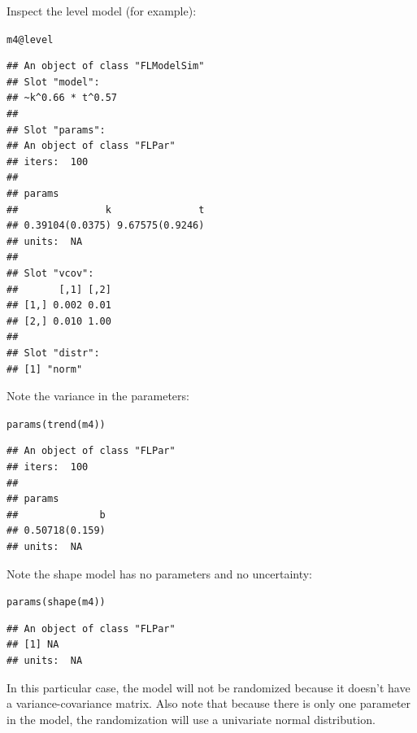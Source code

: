 \documentclass[a4paper,english,10pt]{article}\usepackage[]{graphicx}\usepackage[]{color}
\makeatletter
\newcommand{\hlopt}[1]{\textcolor[rgb]{0.196,0.196,0.196}{#1}}%
\newcommand{\hlstd}[1]{\textcolor[rgb]{0.196,0.196,0.196}{#1}}%
\newcommand{\hlkwc}[1]{\textcolor[rgb]{0,0.631,0.314}{#1}}%
\newcommand{\hlkwd}[1]{\textcolor[rgb]{0.78,0.227,0.412}{#1}}%
\newenvironment{kframe}{%
 \def\at@end@of@kframe{}%
 \ifinner\ifhmode%
  \def\at@end@of@kframe{\end{minipage}}%
  \begin{minipage}{\columnwidth}%
 \fi\fi%
 \def\FrameCommand##1{\hskip\@totalleftmargin \hskip-\fboxsep
 \colorbox{shadecolor}{##1}\hskip-\fboxsep
     \hskip-\linewidth \hskip-\@totalleftmargin \hskip\columnwidth}%
 \MakeFramed {\advance\hsize-\width
   \@totalleftmargin\z@ \linewidth\hsize
   \@setminipage}}%
 {\par\unskip\endMakeFramed%
 \at@end@of@kframe}
\newenvironment{knitrout}{}{} %
\makeatother
\begin{document}
Inspect the level model (for example):

\begin{knitrout}
\color{fgcolor}\begin{kframe}
\begin{alltt}
\hlstd{m4}\hlopt{@}\hlkwc{level}
\end{alltt}
\begin{verbatim}
## An object of class "FLModelSim"
## Slot "model":
## ~k^0.66 * t^0.57
## 
## Slot "params":
## An object of class "FLPar"
## iters:  100 
## 
## params
##               k               t 
## 0.39104(0.0375) 9.67575(0.9246) 
## units:  NA 
## 
## Slot "vcov":
##       [,1] [,2]
## [1,] 0.002 0.01
## [2,] 0.010 1.00
## 
## Slot "distr":
## [1] "norm"
\end{verbatim}
\end{kframe}
\end{knitrout}

Note the variance in the parameters: 

\begin{knitrout}
\color{fgcolor}\begin{kframe}
\begin{alltt}
\hlkwd{params}\hlstd{(}\hlkwd{trend}\hlstd{(m4))}
\end{alltt}
\begin{verbatim}
## An object of class "FLPar"
## iters:  100 
## 
## params
##              b 
## 0.50718(0.159) 
## units:  NA
\end{verbatim}
\end{kframe}
\end{knitrout}

Note the shape model has no parameters and no uncertainty:

\begin{knitrout}
\color{fgcolor}\begin{kframe}
\begin{alltt}
\hlkwd{params}\hlstd{(}\hlkwd{shape}\hlstd{(m4))}
\end{alltt}
\begin{verbatim}
## An object of class "FLPar"
## [1] NA
## units:  NA
\end{verbatim}
\end{kframe}
\end{knitrout}

In this particular case, the  model will not be randomized because it doesn't have a variance-covariance matrix. Also note that because there is only one parameter in the  model, the randomization will use a univariate normal distribution.
\end{document}

